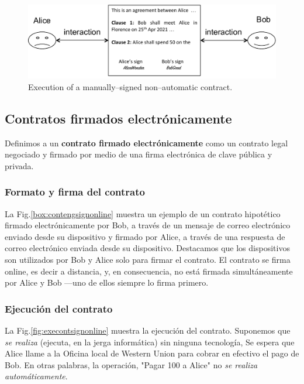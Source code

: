 \documentclass[12pt]{report} %
\begin{document}
\begin{figure}
\centering
\includegraphics[width=0.95\columnwidth]{figures/execontsignmanual.pdf}
\caption{Execution of a manually--signed non--automatic 
         contract.}
\label{fig:execontsignmanual}
\end{figure}






\subsection{Contratos firmados electrónicamente}

Definimos a un \textbf{contrato firmado electrónicamente} como un contrato legal negociado y firmado por medio de una firma electrónica de clave pública y privada.

\subsubsection{Formato y firma del contrato}

La Fig.\ref{box:contengsignonline} muestra un ejemplo de un contrato hipotético firmado electrónicamente por Bob, a través de un mensaje de correo electrónico enviado desde su dispositivo y firmado por Alice, a través de una respuesta de correo electrónico enviada desde su dispositivo. Destacamos que los dispositivos son utilizados por Bob y Alice solo para firmar el contrato. El contrato se firma online, es decir a distancia, y, en consecuencia, no está firmada simultáneamente por Alice y Bob —uno de ellos siempre
lo firma primero.

\subsubsection{Ejecución del contrato}

La Fig.\ref{fig:execontsignonline} muestra la ejecución del contrato. Suponemos que \emph{se realiza} (ejecuta, en la jerga informática) sin ninguna tecnología, Se espera que Alice llame a la Oficina local de Western Union para cobrar en efectivo el pago de Bob. En otras palabras, la operación, "Pagar 100 a Alice" no \emph{se realiza automáticamente}.
\end{document}
